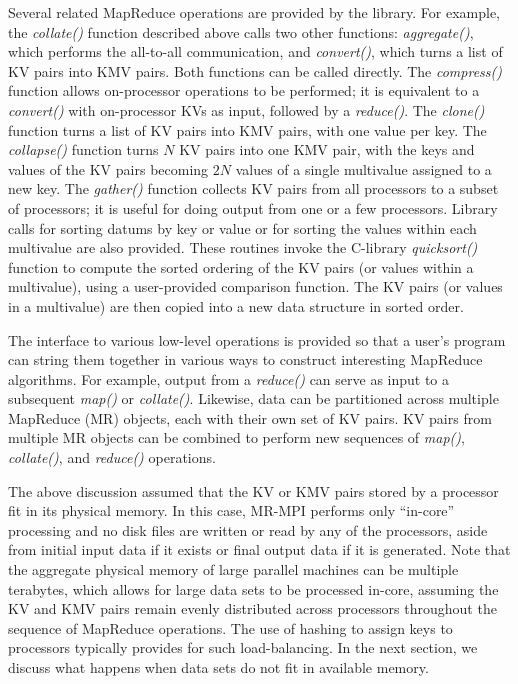 Several related MapReduce operations are provided by the library.  For
example, the {\it collate()} function described above calls two other
functions: {\it aggregate()}, which performs the all-to-all
communication, and {\it convert()}, which turns a list of KV pairs
into KMV pairs.  Both functions can be called directly.  The {\it
compress()} function allows on-processor operations to be performed;
it is equivalent to a {\it convert()} with on-processor KVs as input,
followed by a {\it reduce()}.  The {\it clone()} function turns a list
of KV pairs into KMV pairs, with one value per key.  The {\it
collapse()} function turns $N$ KV pairs into one KMV pair, with the
keys and values of the KV pairs becoming $2N$ values of a single
multivalue assigned to a new key.  The {\it gather()} function
collects KV pairs from all processors to a subset of processors; it is
useful for doing output from one or a few processors.  Library calls
for sorting datums by key or value or for sorting the values within
each multivalue are also provided.  These routines invoke the
C-library {\it quicksort()} function to compute the sorted ordering of
the KV pairs (or values within a multivalue), using a user-provided
comparison function.  The KV pairs (or values in a multivalue) are
then copied into a new data structure in sorted order.

The interface to various low-level operations is provided so that a
user's program can string them together in various ways to construct
interesting MapReduce algorithms.  For example, output from a {\it
reduce()} can serve as input to a subsequent {\it map()} or {\it
collate()}.  Likewise, data can be partitioned across multiple
MapReduce (MR) objects, each with their own set of KV pairs.  KV pairs
from multiple MR objects can be combined to perform new sequences of
{\it map()}, {\it collate()}, and {\it reduce()} operations.

The above discussion assumed that the KV or KMV pairs stored by a
processor fit in its physical memory.  In this case, MR-MPI performs
only ``in-core'' processing and no disk files are written or read by
any of the processors, aside from initial input data if it exists or
final output data if it is generated.  Note that the aggregate
physical memory of large parallel machines can be multiple terabytes,
which allows for large data sets to be processed in-core, assuming the
KV and KMV pairs remain evenly distributed across processors
throughout the sequence of MapReduce operations.  The use of hashing
to assign keys to processors typically provides for such
load-balancing.  In the next section, we discuss what happens when
data sets do not fit in available memory.
